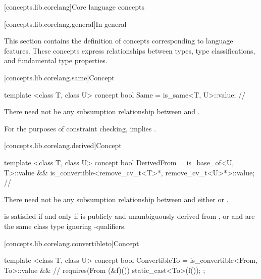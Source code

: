 [concepts.lib.corelang]{Core language concepts}

[concepts.lib.corelang.general]{In general}

\pnum
This section contains the definition of concepts corresponding to language features.
These concepts express relationships between types, type classifications, and
fundamental type properties.

[concepts.lib.corelang.same]{Concept }

%
\begin{itemdecl}
template <class T, class U>
concept bool Same = is_same<T, U>::value; // \seebelow
\end{itemdecl}

\begin{itemdescr}
\pnum
There need not be any subsumption relationship between  and
.

\pnum
\remarks For the purposes of constraint checking,  implies
.
\end{itemdescr}

[concepts.lib.corelang.derived]{Concept }

%
\begin{itemdecl}
template <class T, class U>
concept bool DerivedFrom =
  is_base_of<U, T>::value &&
  is_convertible<remove_cv_t<T>*, remove_cv_t<U>*>::value; // \seebelow
\end{itemdecl}

\begin{itemdescr}
\pnum
There need not be any subsumption relationship between 
and either  or
.

\pnum
\enternote {} is satisfied if and only if  is
publicly and unambiguously derived from , or  and 
are the same class type ignoring \cv-qualifiers. \exitnote
\end{itemdescr}

[concepts.lib.corelang.convertibleto]{Concept }

%
\begin{itemdecl}
template <class T, class U>
concept bool ConvertibleTo =
  is_convertible<From, To>::value && // \seebelow
  requires(From (&f)()) {
    static_cast<To>(f());
  };
\end{itemdecl}

